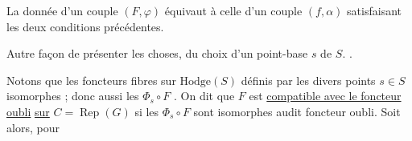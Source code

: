 La donnée d'un couple $(F,\varphi)$ équivaut à celle d'un couple $(f,\alpha)$ satisfaisant les deux conditions précédentes.


Autre façon de présenter les choses,  du choix d'un point-base $s$ de $S$. .

 Notons que les foncteurs fibres  sur  $\mathrm{Hodge}(S)$ définis par les divers points $s\in S$   isomorphes ; donc aussi les $\Phi_s\circ F$ . On dit que  $F$ est \uline{compatible avec le foncteur} \uline{oubli} \uline{sur} $C=\operatorname{Rep}(G)$ si les $\Phi_s\circ F$ sont isomorphes audit foncteur oubli. Soit alors, pour

